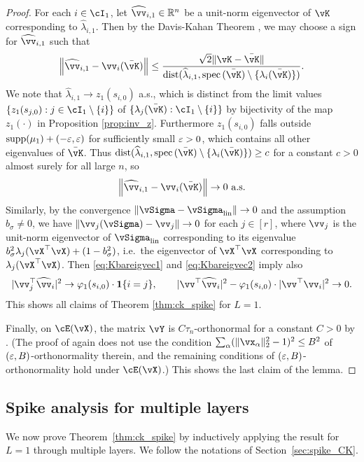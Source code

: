 \begin{proof}
For each $i \in \cI_1$, let $\widehat \vv_{i,1} \in \R^n$ be a
	unit-norm eigenvector of $\vK$ 
	corresponding to $\widehat \lambda_{i,1}$.
Then by the Davis-Kahan Theorem \cite{davis1970rotation},
we may choose a sign for $\widehat \vv_{i,1}$ such that
	\[\norm{\widehat\vv_{i,1}-\vv_i(\bar\vK)} \le
\frac{\sqrt{2}\|\vK-\bar{\vK}\|}{\dist{
\widehat{\lambda}_{i,1},\spec{(\bar\vK)}\setminus \{\lambda_i(\bar\vK)\}}}.\]
We note that $\widehat{\lambda}_{i,1} \to z_1(s_{i,0})$ a.s., which is distinct
from the limit values $\{z_1(s_{j,0}):j \in \cI_1 \setminus \{i\}\}$ of
$\{\lambda_j(\bar \vK):\cI_1 \setminus \{i\}\}$
by bijectivity of the map $z_1(\cdot)$ in Proposition
\ref{prop:inv_z}. Furthermore $z_1(s_{i,0})$ falls outside
$\mathrm{supp}({\mu_1})+(-\varepsilon,\varepsilon)$ for sufficiently small $\varepsilon>0$,
which contains all other eigenvalues of $\bar \vK$.
Thus $\dist{\widehat{\lambda}_{i,1},\spec{(\bar\vK)}\setminus
\{\lambda_i(\bar\vK)\}} \geq c$ for a constant $c>0$ almost surely for
all large $n$, so
\[\norm{\widehat\vv_{i,1}-\vv_i(\bar\vK)} \to 0 \text{ a.s.}\]
Similarly, by the convergence
$\|\vSigma-\vSigma_{\mathrm{lin}}\| \to 0$ and the assumption $b_\sigma \neq 0$,
we have $\norm{\vv_j(\vSigma)-\vv_j} \to 0$ for each $j \in [r]$, where $\vv_j$
is the unit-norm eigenvector of $\vSigma_{\mathrm{lin}}$ corresponding to
its eigenvalue
$b_\sigma^2\lambda_j(\vX^\top \vX)+(1-b_\sigma^2)$, i.e.\ the
eigenvector of $\vX^\top \vX$ corresponding to $\lambda_j(\vX^\top \vX)$.
Then \eqref{eq:Kbareigvec1} and \eqref{eq:Kbareigvec2} imply also
\[|\vv_j^\top \widehat \vv_i|^2 \to \varphi_1(s_{i,0}) \cdot \bI\{i=j\},
\qquad |\vv^\top \widehat \vv_i|^2-\varphi_1(s_{i,0}) \cdot|\vv^\top\vv_i|^2 \to 0.\]
This shows all claims of Theorem \ref{thm:ck_spike} for $L=1$.

Finally, on $\cE(\vX)$, the matrix $\vY$ is $C\tau_n$-orthonormal for a
constant $C>0$ by \cite[Lemma D.3(b)]{fan2020spectra}.
(The proof of \cite[Lemma D.3(b)]{fan2020spectra} again does not use
the condition $\sum_\alpha (\|\vx_\alpha\|_2^2-1)^2 \leq B^2$ of
$(\varepsilon,B)$-orthonormality therein, and the remaining conditions of
$(\varepsilon,B)$-orthonormality hold under $\cE(\vX)$.)
This shows the last claim of the lemma.
\end{proof}

\subsection{Spike analysis for multiple layers}\label{subsec:propagation}

We now prove Theorem~\ref{thm:ck_spike} by inductively applying the result for
$L=1$ through multiple layers. We follow the notations of
Section~\ref{sec:spike_CK}.\\

